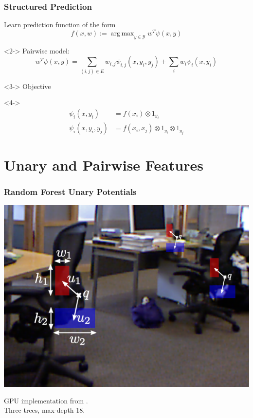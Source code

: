 \documentclass[final,ignorenonframetext,compress]{beamer}
\DeclareMathOperator*{\argmax}{arg\,max}
\begin{document}
    \begin{frame}
        \frametitle{Structured Prediction}
        Learn prediction function of the form
        \[f(x, w) := \argmax_{y \in \mathcal{Y}}  w^T \psi(x, y) \]
        \begin{visibleenv}<2->
            Pairwise model:
            \[w^T \psi(x, y) = \sum_{(i, j) \in E} w_{i,j} \psi_{i,j}(x, y_i, y_j) + \sum_i w_i \psi_i(x, y_i)\]
        \end{visibleenv}
        \begin{visibleenv}<3->
        Objective
        \end{visibleenv}
        \begin{visibleenv}<4->
            \begin{align*}
                \psi_i(x, y_i) &= f(x_i) \otimes 1_{y_i}\\
                \psi_i(x, y_i, y_j) &= f(x_i, x_j) \otimes 1_{y_i} \otimes 1_{y_j}
            \end{align*}
        \end{visibleenv}

    \end{frame}

    \section{Unary and Pairwise Features}
    \begin{frame}
        \frametitle{Random Forest Unary Potentials}
        \begin{center}
            \includegraphics[width=.6\linewidth]{images/joerg_rf_features}
        \end{center}
        GPU implementation from \citet{stueckler2013}.\\
        Three trees, max-depth 18.
    \end{frame}
\end{document}
